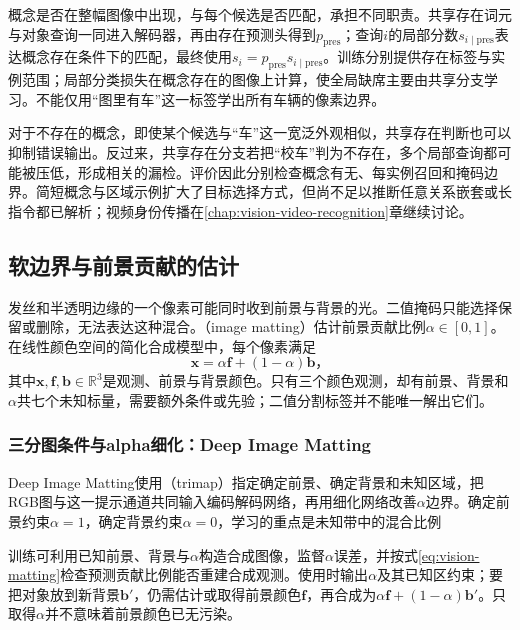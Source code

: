 概念是否在整幅图像中出现，与每个候选是否匹配，承担不同职责。共享存在词元与对象查询一同进入解码器，再由存在预测头得到$p_{\mathrm{pres}}$；查询$i$的局部分数$s_{i\mid\mathrm{pres}}$表达概念存在条件下的匹配，最终使用$s_i=p_{\mathrm{pres}}s_{i\mid\mathrm{pres}}$。训练分别提供存在标签与实例范围；局部分类损失在概念存在的图像上计算，使全局缺席主要由共享分支学习。不能仅用“图里有车”这一标签学出所有车辆的像素边界。

对于不存在的概念，即使某个候选与“车”这一宽泛外观相似，共享存在判断也可以抑制错误输出。反过来，共享存在分支若把“校车”判为不存在，多个局部查询都可能被压低，形成相关的漏检。评价因此分别检查概念有无、每实例召回和掩码边界。简短概念与区域示例扩大了目标选择方式，但尚不足以推断任意关系嵌套或长指令都已解析；视频身份传播在\ref{chap:vision-video-recognition}章继续讨论。

\subsection{软边界与前景贡献的估计}
\label{sec:vision-recognition-matting}

发丝和半透明边缘的一个像素可能同时收到前景与背景的光。二值掩码只能选择保留或删除，无法表达这种混合。（image matting）估计前景贡献比例$\alpha\in[0,1]$。在线性颜色空间的简化合成模型中，每个像素满足
\begin{equation}
 \bm{x}=\alpha\bm{f}+(1-\alpha)\bm{b}\text{，}
 \label{eq:vision-matting}
\end{equation}
其中$\bm{x},\bm{f},\bm{b}\in\mathbb{R}^3$是观测、前景与背景颜色。只有三个颜色观测，却有前景、背景和$\alpha$共七个未知标量，需要额外条件或先验；二值分割标签并不能唯一解出它们。

\subsubsection{三分图条件与alpha细化：Deep Image Matting}
\label{sec:vision-recognition-deep-matting}

Deep Image Matting使用（trimap）指定确定前景、确定背景和未知区域，把RGB图与这一提示通道共同输入编码解码网络，再用细化网络改善$\alpha$边界。确定前景约束$\alpha=1$，确定背景约束$\alpha=0$，学习的重点是未知带中的混合比例

训练可利用已知前景、背景与$\alpha$构造合成图像，监督$\alpha$误差，并按式\eqref{eq:vision-matting}检查预测贡献比例能否重建合成观测。使用时输出$\alpha$及其已知区约束；要把对象放到新背景$\bm{b}'$，仍需估计或取得前景颜色$\bm{f}$，再合成为$\alpha\bm{f}+(1-\alpha)\bm{b}'$。只取得$\alpha$并不意味着前景颜色已无污染。


